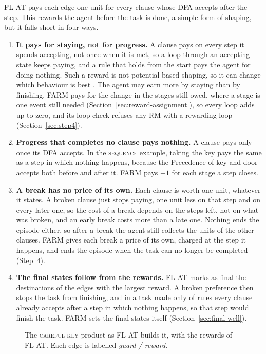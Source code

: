 \documentclass[11pt,english,listoffigures,listoftables]{tfgetsinf}
\newcommand{\runex}[1]{\textsc{#1}}  %
\begin{document}
FL-AT pays each edge one unit for every clause whose DFA accepts after the step. This rewards the agent before the task is done, a simple form of shaping, but it falls short in four ways.
\begin{enumerate}
    \item \textbf{It pays for staying, not for progress.} A clause pays on every step it spends accepting, not once when it is met, so a loop through an accepting state keeps paying, and a rule that holds from the start pays the agent for doing nothing. Such a reward is not potential-based shaping, so it can change which behaviour is best \cite{ng1999policy}. The agent may earn more by staying than by finishing. FARM pays for the change in the stages still owed, where a stage is one event still needed (Section~\ref{sec:reward-assignment}), so every loop adds up to zero, and its loop check refuses any RM with a rewarding loop (Section~\ref{sec:step4}).
    \item \textbf{Progress that completes no clause pays nothing.} A clause pays only once its DFA accepts. In the \runex{sequence} example, taking the key pays the same as a step in which nothing happens, because the Precedence of key and door accepts both before and after it. FARM pays $+1$ for each stage a step closes.
    \item \textbf{A break has no price of its own.} Each clause is worth one unit, whatever it states. A broken clause just stops paying, one unit less on that step and on every later one, so the cost of a break depends on the steps left, not on what was broken, and an early break costs more than a late one. Nothing ends the episode either, so after a break the agent still collects the units of the other clauses. FARM gives each break a price of its own, charged at the step it happens, and ends the episode when the task can no longer be completed (Step~4).
    \item \textbf{The final states follow from the rewards.} FL-AT marks as final the destinations of the edges with the largest reward. A broken preference then stops the task from finishing, and in a task made only of rules every clause already accepts after a step in which nothing happens, so that step would finish the task. FARM sets the final states itself (Section~\ref{sec:final-well}).
\end{enumerate}

\begin{figure}[H]
\centering
{}
\caption[Product of the \runex{careful key}]{The \runex{careful-key} product as FL-AT builds it, with the rewards of FL-AT. Each edge is labelled \textit{guard / reward}.}
\label{fig:run-product3}
\end{figure}
\end{document}
